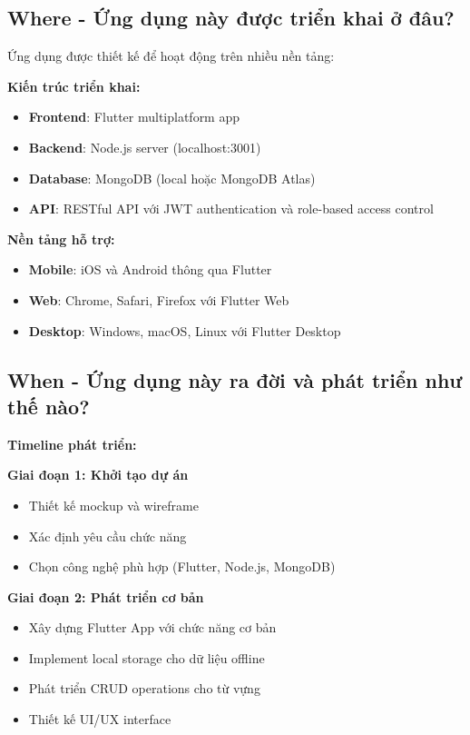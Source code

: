 \documentclass[12pt,a4paper]{article}
\begin{document}
\subsection{Where - Ứng dụng này được triển khai ở đâu?}

Ứng dụng được thiết kế để hoạt động trên nhiều nền tảng:

\textbf{Kiến trúc triển khai:}
\begin{itemize}
    \item \textbf{Frontend}: Flutter multiplatform app
    \item \textbf{Backend}: Node.js server (localhost:3001)
    \item \textbf{Database}: MongoDB (local hoặc MongoDB Atlas)
    \item \textbf{API}: RESTful API với JWT authentication và role-based access control
\end{itemize}

\textbf{Nền tảng hỗ trợ:}
\begin{itemize}
    \item \textbf{Mobile}: iOS và Android thông qua Flutter
    \item \textbf{Web}: Chrome, Safari, Firefox với Flutter Web
    \item \textbf{Desktop}: Windows, macOS, Linux với Flutter Desktop
\end{itemize}

\subsection{When - Ứng dụng này ra đời và phát triển như thế nào?}

\textbf{Timeline phát triển:}

\textbf{Giai đoạn 1: Khởi tạo dự án}
\begin{itemize}
    \item Thiết kế mockup và wireframe
    \item Xác định yêu cầu chức năng
    \item Chọn công nghệ phù hợp (Flutter, Node.js, MongoDB)
\end{itemize}

\textbf{Giai đoạn 2: Phát triển cơ bản}
\begin{itemize}
    \item Xây dựng Flutter App với chức năng cơ bản
    \item Implement local storage cho dữ liệu offline
    \item Phát triển CRUD operations cho từ vựng
    \item Thiết kế UI/UX interface
\end{itemize}
\end{document}
